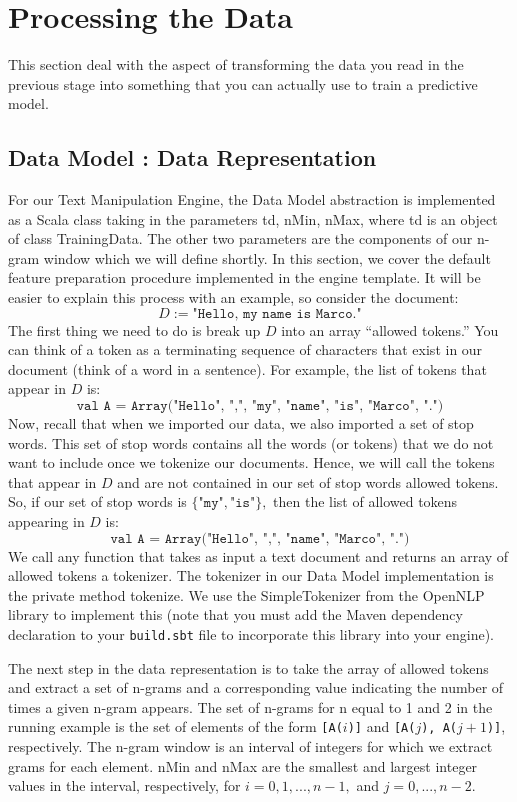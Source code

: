 \documentclass[a4paper,12pt]{article}
\renewcommand{\tt}[1]{\texttt{#1}}
\newcommand{\3}{\left}
\newcommand{\4}{\right}
\renewcommand{\-}[1]{{}^{-#1}}
\begin{document}
\section*{Processing the Data}

This section deal with the aspect of transforming the data you read in the previous stage into something that you can actually use to train a predictive model.

\subsection*{Data Model : Data Representation}

For our Text Manipulation Engine, the Data Model abstraction is implemented as a Scala class taking in the parameters td, nMin, nMax, where td is an object of class TrainingData. The other two parameters are the components of our n-gram window which we will define shortly. In this section, we cover the default feature preparation procedure implemented in the engine template. It will be easier to explain this process with an example, so consider the document:
$$
D := \tt{"Hello, my name is Marco."}
$$
The first thing we need to do is break up $D$ into an array \enquote{allowed tokens.} You can think of a token as a terminating sequence of characters that exist in our document (think of a word in a sentence). For example, the list of tokens that appear in $D$ is:
$$
\tt{val A = Array("Hello", ",", "my",  "name", "is", "Marco", ".")}
$$
Now, recall that when we imported our data, we also imported a set of stop words. This set of stop words contains all the words (or tokens) that we do not want to include once we tokenize our documents. Hence, we will call the tokens that appear in $D$ and are not contained in our set of stop words allowed tokens. So, if our set of stop words is $\{\tt{"my"}, \tt{"is"}\},$ then the list of allowed tokens appearing in $D$ is:
$$
\tt{val A = Array("Hello", ",",  "name", "Marco", ".")}
$$
We call any function that takes as input a text document and returns an array of allowed tokens a tokenizer. The tokenizer in our Data Model implementation is the private method tokenize. We use the SimpleTokenizer from the OpenNLP library to implement this (note that you must add the Maven dependency declaration to your \tt{build.sbt} file to incorporate this library into your engine).

 The next step in the data representation is to take the array of allowed tokens and extract a set of n-grams and a corresponding value indicating the number of times a given n-gram appears. The set of n-grams for n equal to 1 and 2 in the running example is the set of elements of the form \tt{[A($i$)]} and \tt{[A($j$), A($j + 1$)]}, respectively. The n-gram window is an interval of integers for which we extract grams for each element. nMin and nMax are the smallest and largest integer values in the interval, respectively, for $i = 0, 1, ..., n - 1,$ and $j = 0, ..., n - 2.$ 
\end{document}
